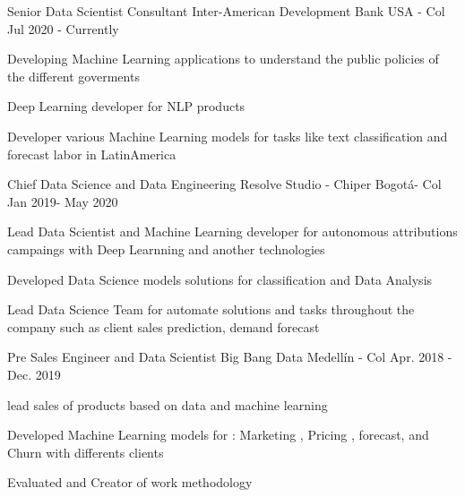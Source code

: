 

\begin{cventries}

\cventry
    {Senior Data Scientist Consultant} %
    {Inter-American Development Bank} %
    {USA - Col} %
    {Jul 2020 - Currently} %
    {
      \begin{cvitems} %
        \item {Developing Machine Learning applications to understand the public policies of the different goverments}
        \item {Deep Learning developer for NLP products}
        \item {Developer various Machine Learning models for tasks like text classification and forecast labor in LatinAmerica}
      \end{cvitems}
    }



  

  \cventry
    {Chief Data Science and Data Engineering } %
    {Resolve Studio - Chiper} %
    {Bogotá- Col} %
    {Jan 2019- May 2020} %
    {
      \begin{cvitems} %
        \item {Lead Data Scientist and Machine Learning developer for autonomous attributions campaings with Deep Learnning and another technologies}
        \item {Developed  Data Science models solutions  for classification and Data Analysis}
        \item{Lead Data Science Team  for automate solutions and tasks throughout the company such as client sales prediction, demand forecast}
      \end{cvitems}
    }

  \cventry
    {Pre Sales Engineer and Data Scientist} %
    {Big Bang Data} %
    {Medellín - Col} %
    {Apr. 2018 - Dec. 2019} %
    {
      \begin{cvitems} %
        \item {lead sales of products based on data and machine learning}
        \item {Developed Machine Learning models for : Marketing , Pricing , forecast, and Churn with differents clients}
        \item {Evaluated and Creator of work methodology}
      \end{cvitems}
    }
    


\end{cventries}
